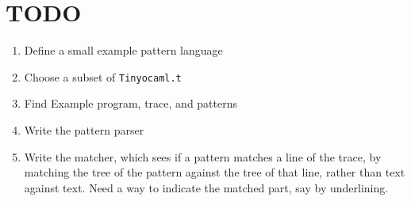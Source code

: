 \documentclass[10pt]{article}
\begin{document}
\section{TODO}

\begin{enumerate}
\item Define a small example pattern language
\item Choose a subset of \texttt{Tinyocaml.t}
\item Find Example program, trace, and patterns
\item Write the pattern parser
\item Write the matcher, which sees if a pattern matches a line of the trace, by matching the tree of the pattern against the tree of that line, rather than text against text. Need a way to indicate the matched part, say by underlining.
\end{enumerate}
\end{document}
